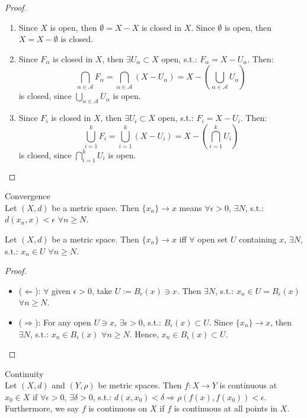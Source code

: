 \begin{proof}
    \begin{enumerate}
        \item Since $X$ is open, then $\emptyset = X-X$ is closed in $X$. Since $\emptyset$ is open, then $X=X-\emptyset$ is closed.
        \item Since $F_\alpha$ is closed in $X$, then $\exists U_\alpha \subset X$ open, s.t.: $F_\alpha = X-U_\alpha$. Then:
        $$\bigcap_{\alpha\in \mathcal{A}}F_\alpha=\bigcap_{\alpha \in \mathcal{A}}(X-U_\alpha) = X-(\bigcup_{\alpha \in \mathcal{A}}U_\alpha)$$
        is closed, since $\bigcup_{\alpha \in \mathcal{A}}U_\alpha$ is open.
        \item Since $F_i$ is closed in $X$, then $\exists U_i \subset X$ open, s.t.: $F_i=X-U_i$. Then:
        $$\bigcup _{i=1}^kF_i=\bigcup_{i=1}^k(X-U_i)=X-(\bigcap _{i=1}^kU_i)$$
        is closed, since $\bigcap _{i=1}^kU_i$ is open.
    \end{enumerate}
\end{proof}

\begin{definition}{Convergence}\\
Let $(X,d)$ be a metric space. Then $\{x_n\} \rightarrow x$ means $\forall \epsilon>0$, $\exists N$, s.t.: $d(x_n,x) < \epsilon$ $\forall n \geq N$.
\end{definition}

\begin{proposition}
    Let $(X,d)$ be a metric space. Then $\{x_n\} \rightarrow x$ iff $\forall$ open set $U$ containing $x$, $\exists N$, s.t.: $x_n \in U$ $\forall n\geq N$.
\end{proposition}

\begin{proof}
    \begin{itemize}
        \item ($\Leftarrow$): $\forall$ given $\epsilon>0$, take $U:= B_\epsilon (x) \ni x$. Then $\exists N$, s.t.: $x_n \in U =B_\epsilon (x)$ $\forall n \geq N$.
        \item ($\Rightarrow$): For any open $U \ni x$, $\exists \epsilon>0$, s.t.: $B_\epsilon (x) \subset U$. Since $\{x_n\} \rightarrow x$, then $\exists N$, s.t.: $x_n \in B_\epsilon (x)$ $\forall n \geq N$. Hence, $x_n \in B_\epsilon(x) \subset U$.
    \end{itemize}
\end{proof}

\begin{definition}{Continuity}\\
Let $(X,d)$ and $(Y,\rho )$ be metric spaces. Then $f: X \rightarrow Y$ is continuous at $x_0 \in X$ if $\forall \epsilon>0$, $\exists \delta >0$, s.t.: $d(x,x_0) < \delta \Rightarrow \rho (f(x),f(x_0))< \epsilon$.\\
Furthermore, we say $f$ is continuous on $X$ if $f$ is continuous at all points in $X$.
\end{definition}

